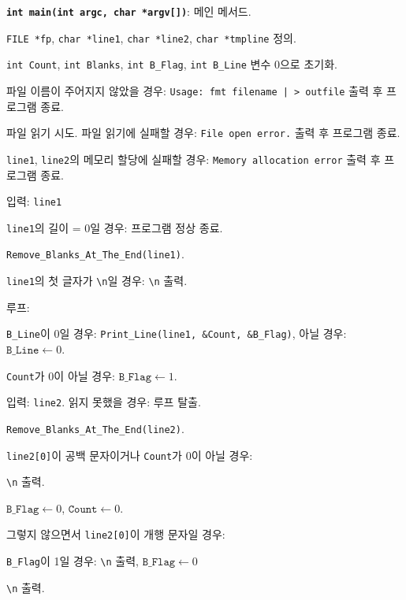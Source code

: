 \documentclass[runningheads]{../../../llncs}
\begin{document}
\textbf{\texttt{int main(int argc, char *argv[])}}: 메인 메서드.
\begin{algorithm}
	\item \texttt{FILE *fp}, \texttt{char *line1}, \texttt{char *line2}, \texttt{char *tmpline} 정의.
	\item \texttt{int Count}, \texttt{int Blanks}, \texttt{int B_Flag}, \texttt{int B_Line} 변수 0으로 초기화.	
	\item 파일 이름이 주어지지 않았을 경우: \texttt{Usage: fmt filename | > outfile} 출력 후 프로그램 종료.
	\item 파일 읽기 시도. 파일 읽기에 실패할 경우: \texttt{File open error.} 출력 후 프로그램 종료.
	\item \texttt{line1}, \texttt{line2}의 메모리 할당에 실패할 경우: \texttt{Memory allocation error} 출력 후 프로그램 종료.
	\item 입력: \texttt{line1}
	\item \texttt{line1}의 길이 = 0일 경우: 프로그램 정상 종료.
	\item \texttt{Remove_Blanks_At_The_End(line1)}.
	\item \texttt{line1}의 첫 글자가 \texttt{\textbackslash{}n}일 경우: \texttt{\textbackslash{}n} 출력.
	\item 루프:
			\begin{algorithm}
				\item \texttt{B_Line}이 0일 경우: \texttt{Print_Line(line1, \&Count, \&B_Flag)}, 아닐 경우: $\texttt{B_Line} \leftarrow 0$.
				\item \texttt{Count}가 0이 아닐 경우: $\texttt{B_Flag} \leftarrow 1$.
				\item 입력: \texttt{line2}. 읽지 못했을 경우: 루프 탈출.
				\item \texttt{Remove_Blanks_At_The_End(line2)}.
				\item \texttt{line2[0]}이 공백 문자이거나 \texttt{Count}가 0이 아닐 경우:
					\begin{algorithm}
						\item \texttt{\textbackslash{}n} 출력.
						\item $\texttt{B_Flag} \leftarrow 0$, $\texttt{Count} \leftarrow 0$.
					\end{algorithm}
				\item 그렇지 않으면서 \texttt{line2[0]}이 개행 문자일 경우:
					\begin{algorithm}
						\item \texttt{B_Flag}이 1일 경우: \texttt{\textbackslash{}n} 출력, $\texttt{B_Flag} \leftarrow 0$
						\item \texttt{\textbackslash{}n} 출력.

\end{algorithm}
\end{algorithm}
\end{algorithm}
\end{document}
